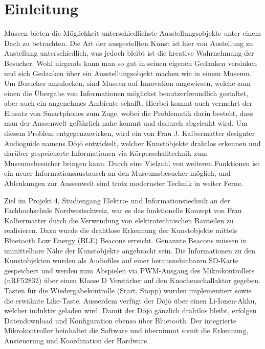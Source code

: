 \section{Einleitung}\label{sec:einleitung}

Museen bieten die Möglichkeit unterschiedlichste Ausstellungsobjekte unter einem Dach zu betrachten. Die Art der ausgestellten Kunst ist hier von Austellung zu Austellung unterschiedlich, was jedoch bleibt ist die kreative Wahrnehmung der Besucher. Wohl nirgends kann man so gut in seinen eigenen Gedanken versinken und sich Gedanken über ein Ausstellungsobjekt machen wie in einem Museum. Um Besucher anzulocken, sind Museen auf Innovation angewiesen, welche zum einen die Übergabe von Informationen möglichst benutzerfreundlich gestaltet, aber auch ein angenehmes Ambiente schafft. Hierbei kommt auch vermehrt der Einsatz von Smartphones zum Zuge, wobei die Problematik darin besteht, dass man der Aussenwelt gefährlich nahe kommt und dadurch abgelenkt wird. Um diesem Problem entgegenzuwirken, wird ein von Frau J. Kalbermatter designter Audioguide namens Dōjō entwickelt, welcher Kunstobjekte drahtlos erkennen und darüber gespeicherte Informationen via Körperschalltechnik zum Museumsbesucher bringen kann. Durch eine Vielzahl von weiteren Funktionen ist ein neuer Informationsaustausch an den Museumsbesucher möglich, und Ablenkungen zur Aussenwelt sind trotz modernster Technik in weiter Ferne.

Ziel im Projekt 4, Studiengang Elektro- und Informationstechnik an der Fachhochschule Nordwestschweiz, war es das funktionelle Konzept von Frau Kalbermatter durch die Verwendung von elektrotechnischen Bauteilen zu realisieren. Dazu wurde die drahtlose Erkennung der Kunstobjekte mittels Bluetooth Low Energy (BLE) Beacons erreicht. Genannte Beacons müssen in unmittelbare Nähe der Kunstobjekte angebracht sein. Die Informationen zu den Kunstobjekten wurden als Audiofiles auf einer herausnehmbaren SD-Karte gespeichert und werden zum Abspielen via PWM-Ausgang des Mikrokontrollers (nRF52832) über einen Klasse D Verstärker auf den Knochenschallaktor gegeben. Tasten für die Wiedergabekontrolle (Start, Stopp) wurden implementiert sowie die erwähnte \glqq Like\grqq -Taste. Ausserdem verfügt der Dōjō über einen Li-Ionen-Akku, welcher induktiv geladen wird. Damit der Dōjō gänzlich drahtlos bleibt, erfolgen Datendownload und Konfiguration ebenso über Bluetooth. Der integrierte Mikrokontroller beinhaltet die Software und übernimmt somit die Erkennung, Ansteuerung und Koordination der Hardware.

